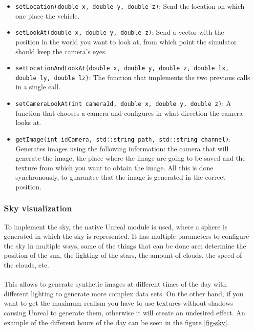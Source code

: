 \documentclass[10pt,a4paper,twocolumn,twoside]{article}
\begin{document}
\begin{itemize}
\setlength\itemsep{0em}
\item \texttt{setLocation(double x, double y, double z)}: Send the location on which one place the vehicle.

\item \texttt{setLookAt(double x, double y, double z)}: Send a vector with the position in the world you want to look at, from which point the simulator should keep the camera's eyes.

\item \texttt{setLocationAndLookAt(double x, double y, double z, double lx, double ly, double lz)}: The function that implements the two previous calls in a single call.

\item \texttt{setCameraLookAt(int cameraId, double x, double y, double z)}: A function that chooses a camera and configures in what direction the camera looks at.

\item \texttt{getImage(int idCamera, std::string path, std::string channel)}: Generates images using the following information: the camera that will generate the image, the place where the image are going to be saved and the texture from which you want to obtain the image. All this is done synchronously, to guarantee that the image is generated in the correct position.
\end{itemize}

\subsubsection{Sky visualization}

To implement the sky, the native Unreal module is used, where a sphere is generated in which the sky is represented. It has multiple parameters to configure the sky in multiple ways, some of the things that can be done are: determine the position of the sun, the lighting of the stars, the amount of clouds, the speed of the clouds, etc.
\\\\
This allows to generate synthetic images at different times of the day with different lighting to generate more complex data sets. On the other hand, if you want to get the maximum realism you have to use textures without shadows causing Unreal to generate them, otherwise it will create an undesired effect. An example of the different hours of the day can be seen in the figure \ref{fig-sky}.
\end{document}
